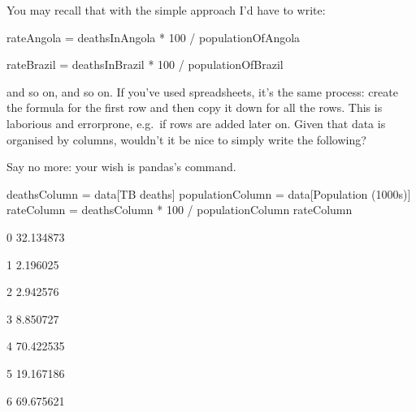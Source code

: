 \documentclass[letterpaper,10pt,english]{sphinxmanual}
\begin{document}
You may recall that with the simple approach I’d have to write:

{
\begin{sphinxVerbatim}[commandchars=\\\{\}]
\llap{\color{nbsphinxin}[ ]:\,\hspace{\fboxrule}\hspace{\fboxsep}}

rateAngola = deathsInAngola * 100 / populationOfAngola


rateBrazil = deathsInBrazil * 100 / populationOfBrazil

\end{sphinxVerbatim}
}

and so on, and so on. If you’ve used spreadsheets, it’s the same process: create the formula for the first row and then copy it down for all the rows. This is laborious and error\sphinxhyphen{}prone, e.g. if rows are added later on. Given that data is organised by columns, wouldn’t it be nice to simply write the following?


Say no more: your wish is pandas’s command.


{
\begin{sphinxVerbatim}[commandchars=\\\{\}]
\llap{\color{nbsphinxin}[ ]:\,\hspace{\fboxrule}\hspace{\fboxsep}}
deathsColumn = data[\PYGZsq{}TB deaths\PYGZsq{}]
populationColumn = data[\PYGZsq{}Population (1000s)\PYGZsq{}]
rateColumn = deathsColumn * 100 / populationColumn
rateColumn
\end{sphinxVerbatim}
}


0 32.134873

1 2.196025

2 2.942576

3 8.850727

4 70.422535

5 19.167186

6 69.675621
\end{document}
